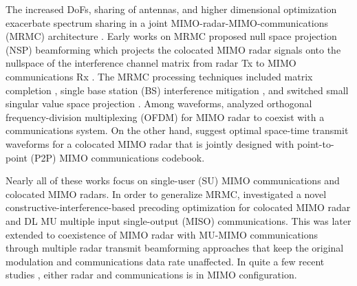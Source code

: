 \documentclass[10pt,journal]{IEEEtran}
\theoremstyle{definition}
\begin{document}
The increased DoFs, sharing of antennas, and higher dimensional optimization exacerbate spectrum sharing in a joint MIMO-radar-MIMO-communications (MRMC) architecture \cite{alaee2020information,dokhanchi2020multi}. %
Early works on MRMC proposed null space projection (NSP) beamforming which projects the colocated MIMO radar signals onto the nullspace of the interference channel matrix from radar Tx to MIMO communications Rx \cite{khawar2015target}. The MRMC processing techniques included matrix completion %
\cite{MCMIMO_RadComm}, single base station (BS) interference mitigation \cite{khawar2015target}, and switched small singular value space projection %
\cite{mahal2017spectral}. %
Among waveforms, \cite{bao2019precoding} analyzed orthogonal frequency-division multiplexing (OFDM) for MIMO radar to coexist with a communications system. On the other hand, \cite{qian2018joint,rihan2018optimum} suggest optimal space-time transmit waveforms for a colocated MIMO radar that is jointly designed with point-to-point (P2P) MIMO communications codebook.
	
	Nearly all of these works focus on single-user (SU) MIMO communications and colocated MIMO radars. In order to generalize MRMC, \cite{liu2018mimo} investigated a novel constructive-interference-based precoding optimization for colocated MIMO radar and DL MU multiple input single-output (MISO) communications. This was later extended to coexistence of MIMO radar with MU-MIMO communications \cite{liu2018mu} through multiple radar transmit beamforming approaches that keep the original modulation and communications data rate unaffected. In quite a few recent studies \cite{d2020uplink,grossi2020joint}, either radar and communications is in MIMO configuration. %
	
\end{document}

